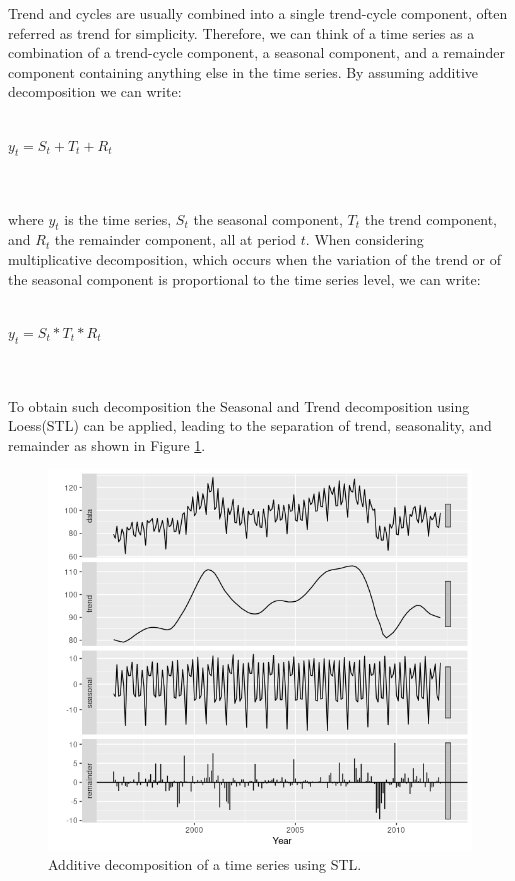 \documentclass[a4paper, 12pt]{article} %
\begin{document}
	Trend and cycles are usually combined into a single trend-cycle component, often referred as trend for simplicity.
	Therefore, we can think of a time series as a combination of a trend-cycle component, a seasonal component, and a remainder component containing anything else in the time series.
	By assuming additive decomposition we can write:\\\\
	\centerline{$y_t = S_t + T_t + R_t$}\\\\
	where $y_t$ is the time series, $S_t$ the seasonal component, $T_t$ the trend component, and $R_t$ the remainder component, all at period $t$. When considering multiplicative decomposition, which occurs when the variation of the trend or of the seasonal component is proportional to the time series level, we can write: \\\\
	\centerline{$y_t = S_t * T_t * R_t$}\\\\
	To obtain such decomposition the Seasonal and Trend decomposition using Loess(STL) \cite{STL} can be applied, leading to the separation of trend, seasonality, and remainder as shown in Figure \ref{fig:stl}.
	\begin{figure}
		\includegraphics[width=\linewidth]{img/sota_ts_additive_decomposition.png}
		\caption{Additive decomposition of a time series using STL.}
		\label{fig:stl}
	\end{figure}
	
\end{document}
